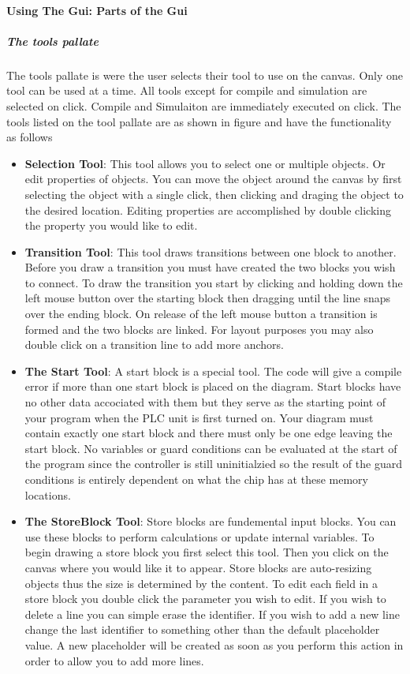 \paragraph{Using The Gui: Parts of the Gui}
\subparagraph{The tools pallate}
The tools pallate is were the user selects their tool to use on the canvas. Only one tool can be used at a time. All tools except for compile and simulation are selected on click. Compile and Simulaiton are immediately executed on click.
The tools listed on the tool pallate are as shown in figure %
and have the functionality as follows
\begin{itemize}
\item \textbf{Selection Tool}: This tool allows you to select one or multiple objects. Or edit properties of objects. You can move the object around the canvas by first selecting the object with a single click, then clicking and draging the object to the desired location. Editing properties are accomplished by double clicking the property you would like to edit.
\item \textbf{Transition Tool}: This tool draws transitions between one block to another. Before you draw a transition you must have created the two blocks you wish to connect. To draw the transition you start by clicking and holding down the left mouse button over the starting block then dragging until the line snaps over the ending block. On release of the left mouse button a transition is formed and the two blocks are linked. For layout purposes you may also double click on a transition  line to add more anchors.
\item \textbf{The Start Tool}: A start block is a special tool. The code will give a compile error if more than one start block is placed on the diagram. Start blocks have no other data accociated with them but they serve as the starting point of your program when the PLC unit is first turned on. Your diagram must contain exactly one start block and there must only be one edge leaving the start block. No variables or guard conditions can be evaluated at the start of the program since the controller is still uninitialzied so the result of the guard conditions is entirely dependent on what the chip has at these memory locations.
\item \textbf{The StoreBlock Tool}: Store blocks are fundemental input blocks. You can use these blocks to perform calculations or update internal variables. To begin drawing a store block you first select this tool. Then you click on the canvas where you would like it to appear. Store blocks are auto-resizing objects thus the size is determined by the content. To edit each field in a store block you double click the parameter you wish to edit. If you wish to delete a line you can simple erase the identifier. If you wish to add a new line change the last identifier to something other than the default placeholder value. A new placeholder will be created as soon as you perform this action in order to allow you to add more lines.

\end{itemize}
